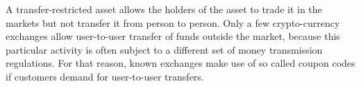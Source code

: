 A transfer-restricted asset allows the holders of the asset to trade it in the
markets but not transfer it from person to person. Only a few crypto-currency
exchanges allow user-to-user transfer of funds outside the market, because this
particular activity is often subject to a different set of money transmission
regulations. For that reason, known exchanges make use of so called coupon
codes if customers demand for user-to-user transfers.
